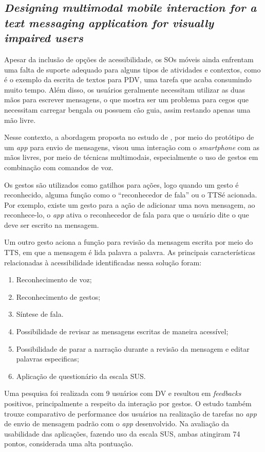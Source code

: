 \subsection{\emph{Designing multimodal mobile interaction for a text messaging application for visually impaired users}}

Apesar da inclusão de opções de acessibilidade, os SOs móveis ainda enfrentam uma falta de suporte adequado para alguns tipos de atividades e contextos, como é o exemplo da escrita de textos para PDV, uma tarefa que acaba consumindo muito tempo.
Além disso, os usuários geralmente necessitam utilizar as duas mãos para escrever mensagens, o que mostra ser um problema para cegos que necessitam carregar bengala ou possuem cão guia, assim restando apenas uma mão livre.

Nesse contexto, a abordagem proposta no estudo de , por meio do protótipo de um \emph{app} para envio de mensagens, visou uma interação com o \emph{smartphone}
com as mãos livres, por meio de técnicas multimodais, especialmente o uso de gestos em combinação com comandos de voz.

Os gestos são utilizados como gatilhos para ações, logo quando um gesto é reconhecido, alguma função como o ``reconhecedor de fala'' ou o TTS\@ é acionada.
Por exemplo, existe um gesto para a ação de adicionar uma nova mensagem, ao reconhece-lo, o \emph{app} ativa o reconhecedor de fala para que o usuário dite o que deve ser escrito na mensagem.

Um outro gesto aciona a função para revisão da mensagem escrita por meio do TTS, em que a mensagem é lida palavra a palavra.
As principais características relacionadas à acessibilidade identificadas nessa solução foram:

\begin{enumerate}
  \item Reconhecimento de voz;
  \item Reconhecimento de gestos;
  \item Síntese de fala.
  \item Possibilidade de revisar as mensagens escritas de maneira acessível;
  \item Possibilidade de parar a narração durante a revisão da mensagem e editar palavras especificas;
  \item Aplicação de questionário da escala SUS\@.
\end{enumerate}

Uma pesquisa foi realizada com 9 usuários com DV e resultou em \emph{feedbacks} positivos, principalmente a respeito da interação por gestos.
O estudo também trouxe comparativo de performance dos usuários na realização de tarefas no \emph{app} de envio de mensagem padrão com o \emph{app} desenvolvido.
Na avaliação da usabilidade das aplicações, fazendo uso da escala SUS, ambas atingiram 74 pontos, considerada uma alta pontuação.

